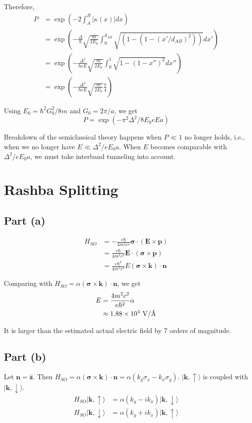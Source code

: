 \documentclass{article}
\begin{document}
Therefore,
\begin{align*}
P&=\exp\left(-2\int_A^B|\kappa(x)|dx\right)\\
&=\exp\left(-\frac{\Delta}{\hbar}\sqrt{\frac{m}{2E_0}}\int_0^{d_{AB}}\sqrt{\left(1-\left(1-(x'/d_{AB})^2\right)\right)}dx'\right)\\
&=\exp\left(-\frac{\Delta^2}{\hbar eE}\sqrt{\frac{m}{2E_0}}\int_0^1\sqrt{1-(1-x'')^2}dx''\right)\\
&=\exp\left(-\frac{\Delta^2}{\hbar eE}\sqrt{\frac{m}{2E_0}}\frac{\pi}{4}\right)
\end{align*}

Using $E_0=\hbar^2G_0^2/8m$ and $G_0=2\pi/a$, we get
\begin{equation*}
P=\exp(-\pi^2\Delta^2/8E_0eEa)
\end{equation*}

Breakdown of the semiclassical theory happens when $P\ll1$ no longer holds, i.e., when we no longer have $E\ll\Delta^2/eE_0a$. When $E$ becomes comparable with $\Delta^2/eE_0a$, we must take interband tunneling into account.

\section{Rashba Splitting}
\subsection{Part (a)}
\begin{align*}
H_{SO}&=-\frac{e\hbar}{4m^2c^2}\bm{\sigma}\cdot(\mathbf{E}\times\mathbf{p})\\
&=\frac{e\hbar}{4m^2c^2}\mathbf{E}\cdot(\bm{\sigma}\times\mathbf{p})\\
&=\frac{e\hbar^2}{4m^2c^2}E(\bm{\sigma}\times\mathbf{k})\cdot\mathbf{n}
\end{align*}

Comparing with $H_{SO}=\alpha(\bm{\sigma}\times\mathbf{k})\cdot\mathbf{n}$, we get
\begin{align*}
E&=\frac{4m^2c^2}{e\hbar^2}\alpha\\
&\approx1.88\times 10^4\textup{ V/\AA}
\end{align*}

It is larger than the estimated actual electric field by 7 orders of magnitude.

\subsection{Part (b)}
Let $\mathbf{n}=\hat{\mathbf{z}}$. Then $H_{SO}=\alpha(\bm{\sigma}\times\mathbf{k})\cdot\mathbf{n}=\alpha(k_y\sigma_x-k_x\sigma_y)$. $|\mathbf{k},\uparrow\rangle$ is coupled with $|\mathbf{k},\downarrow\rangle$.
\begin{align*}
H_{SO}|\mathbf{k},\uparrow\rangle&=\alpha(k_y-ik_x)|\mathbf{k},\downarrow\rangle\\
H_{SO}|\mathbf{k},\downarrow\rangle&=\alpha(k_y+ik_x)|\mathbf{k},\uparrow\rangle
\end{align*}
\end{document}

